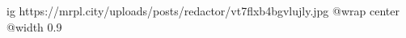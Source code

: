  
 
 
 
 

\ifcmt
  ig https://mrpl.city/uploads/posts/redactor/vt7flxb4bgvlujly.jpg
  @wrap center
  @width 0.9
\fi
